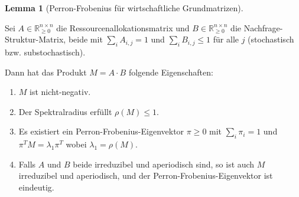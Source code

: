 \documentclass[a4paper,12pt]{article}
\theoremstyle{definition}
\newtheorem{lemma}{Lemma}
\begin{document}
\begin{lemma}[Perron-Frobenius für wirtschaftliche Grundmatrizen]
\label{lem:perron_frobenius_wirtschaft}

Sei $A \in \mathbb{R}^{n \times n}_{\geq 0}$ die Ressourcenallokationsmatrix und $B \in \mathbb{R}^{n \times n}_{\geq 0}$ die Nachfrage-Struktur-Matrix, beide mit $\sum_i A_{i,j} = 1$ und $\sum_i B_{i,j} \leq 1$ für alle $j$ (stochastisch bzw. substochastisch).

Dann hat das Produkt $M = A \cdot B$ folgende Eigenschaften:

\begin{enumerate}
\item $M$ ist nicht-negativ.
\item Der Spektralradius erfüllt $\rho(M) \leq 1$.
\item Es existiert ein Perron-Frobenius-Eigenvektor $\pi \geq 0$ mit $\sum_i \pi_i = 1$ und $\pi^T M = \lambda_1 \pi^T$ wobei $\lambda_1 = \rho(M)$.
\item Falls $A$ und $B$ beide irreduzibel und aperiodisch sind, so ist auch $M$ irreduzibel und aperiodisch, und der Perron-Frobenius-Eigenvektor ist eindeutig.
\end{enumerate}

\end{lemma}
\end{document}
